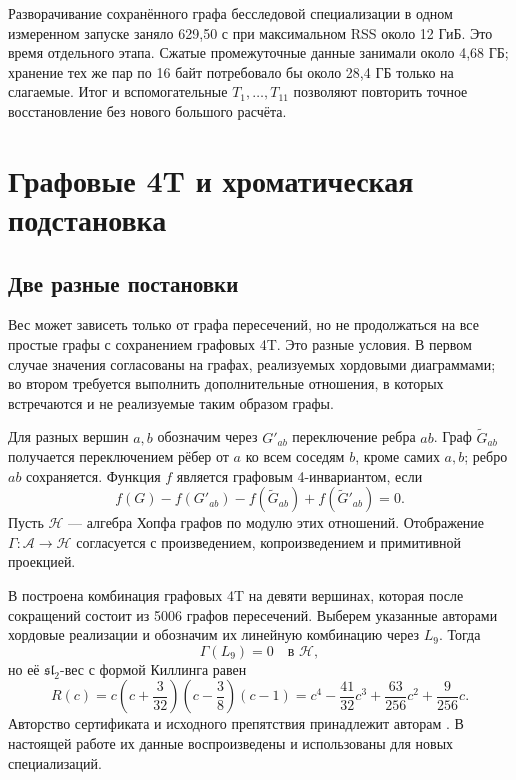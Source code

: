 \documentclass[11pt,a4paper]{article}
\numberwithin{equation}{section}
\theoremstyle{definition}
\theoremstyle{remark}
\newcommand{\sll}{\mathfrak{sl}}
\begin{document}
Разворачивание сохранённого графа бесследовой специализации в одном
измеренном запуске заняло 629{,}50 с при максимальном RSS около
12 ГиБ. Это время отдельного этапа. Сжатые промежуточные данные занимали
около 4{,}68 ГБ; хранение тех же пар по 16 байт потребовало бы около
28{,}4 ГБ только на слагаемые. Итог и вспомогательные $T_1,\ldots,T_{11}$
позволяют повторить точное восстановление без нового большого расчёта.

\section{Графовые 4T и хроматическая подстановка}
\label{sec:graph9}

\subsection{Две разные постановки}

Вес может зависеть только от графа пересечений, но не продолжаться
на все простые графы с сохранением графовых 4T. Это разные условия.
В первом случае значения согласованы на графах, реализуемых хордовыми
диаграммами; во втором требуется выполнить дополнительные отношения,
в которых встречаются и не реализуемые таким образом графы.

Для разных вершин $a,b$ обозначим через $G'_{ab}$ переключение ребра $ab$.
Граф $\widetilde G_{ab}$ получается переключением рёбер от $a$ ко всем
соседям $b$, кроме самих $a,b$; ребро $ab$ сохраняется.
Функция $f$ является графовым 4-инвариантом, если
\begin{equation}\label{eq:graph4t}
 f(G)-f(G'_{ab})-f(\widetilde G_{ab})+f(\widetilde G'_{ab})=0.
\end{equation}
Пусть $\mathcal H$ --- алгебра Хопфа графов по модулю этих отношений.
Отображение $\Gamma:\mathcal A\to\mathcal H$ согласуется с произведением,
копроизведением и примитивной проекцией.

В \cite{fkpu} построена комбинация графовых 4T на девяти вершинах,
которая после сокращений состоит из 5006 графов пересечений.
Выберем указанные авторами хордовые реализации и обозначим их
линейную комбинацию через $L_9$. Тогда
\[
 \Gamma(L_9)=0\quad\text{в }\mathcal H,
\]
но её $\sll_2$-вес с формой Киллинга равен
\begin{equation}\label{eq:r9}
 R(c)=c\left(c+\frac3{32}\right)\left(c-\frac38\right)(c-1)
 =c^4-\frac{41}{32}c^3+\frac{63}{256}c^2+\frac9{256}c.
\end{equation}
Авторство сертификата и исходного препятствия принадлежит
авторам \cite{fkpu}. В настоящей работе их данные воспроизведены
и использованы для новых специализаций.
\end{document}
